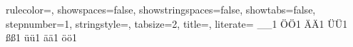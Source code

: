 {rulecolor=\color{black},         																		%
showspaces=false,                																		%
showstringspaces=false,          																		%
showtabs=false,                  																		%
stepnumber=1,                    																		%
stringstyle=\color{java_net_string},     																%
tabsize=2,	                   																		%
title=\lstname,                  		 																%
literate=%
{_}{{\_}}1
{Ö}{{\"O}}1
{Ä}{{\"A}}1
{Ü}{{\"U}}1
{ß}{{\ss}}1
{ü}{{\"u}}1
{ä}{{\"a}}1
{ö}{{\"o}}1																							%
}

